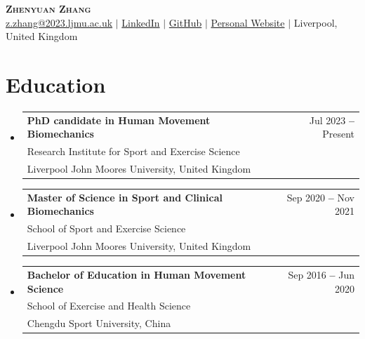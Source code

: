 \documentclass[letterpaper,11pt]{article}
\makeatletter
\newcommand{\resumeEducationHeading}[4]{
\vspace{-2pt}\item
\begin{tabular*}{0.97\textwidth}[t]{l@{\extracolsep{\fill}}r}
\textbf{#1} & #2 \\
\small#3 \\ \small#4 \\
\end{tabular*}\vspace{-2pt}
}
\newcommand{\resumeSubheading}[4]{
\vspace{-2pt}\item
\begin{tabular*}{0.97\textwidth}[t]{l@{\extracolsep{\fill}}r}
\textbf{#1} & #2 \\
\small#3 \\ \small#4 \\
\end{tabular*}\vspace{-2pt}
}
\newcommand{\resumeSubHeadingListStart}{\begin{itemize}[leftmargin=0.15in, label={}]}
\newcommand{\resumeSubHeadingListEnd}{\end{itemize}}
\makeatother
\begin{document}
\begin{center}
\textbf{\Huge \scshape Zhenyuan Zhang} \\ \vspace{3pt}
\small
\faEnvelope \hspace{.5pt} \href{mailto:z.zhang@2023.ljmu.ac.uk}{z.zhang@2023.ljmu.ac.uk}
$|$
\faLinkedinSquare \hspace{.5pt} \href{https://www.linkedin.com/in/zhenyuan-zhang-661359204/}{LinkedIn}
$|$
\faGithub \hspace{.5pt} \href{https://github.com/ClayZhang999}{GitHub}
$|$
\faGlobe \hspace{.5pt} \href{https://ClayZhang999.github.io}{Personal Website}
$|$
\faMapMarker \hspace{.5pt} {Liverpool, United Kingdom}
\end{center}


\section{Education}
\vspace{3pt}
\resumeSubHeadingListStart

\resumeEducationHeading
{PhD candidate in Human Movement Biomechanics} 
{Jul 2023 \textbf{--} Present}
{Research Institute for Sport and Exercise Science}
{Liverpool John Moores University, United Kingdom}
    
\resumeSubheading
{Master of Science in Sport and Clinical Biomechanics} 
{Sep 2020 \textbf{--} Nov 2021}
{School of Sport and Exercise Science}
{Liverpool John Moores University, United Kingdom}

\resumeSubheading
{Bachelor of Education in Human Movement Science}
{Sep 2016 \textbf{--} Jun 2020}
{School of Exercise and Health Science}
{Chengdu Sport University, China}
\resumeSubHeadingListEnd




\end{document}
